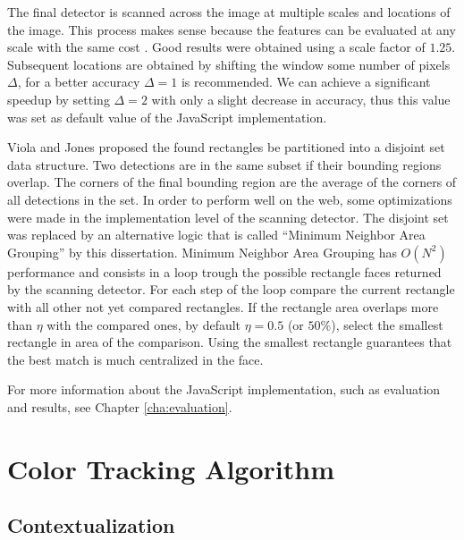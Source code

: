 The final detector is scanned across the image at multiple scales and locations of the image. This process makes sense because the features can be evaluated at any scale with the same cost \cite{Viola2001}. Good results were obtained using a scale factor of $1.25$. Subsequent locations are obtained by shifting the window some number of pixels $\Delta$, for a better accuracy $\Delta=1$ is recommended. We can achieve a significant speedup by setting $\Delta=2$ with only a slight decrease in accuracy, thus this value was set as default value of the JavaScript implementation.

Viola and Jones \cite{Viola2001} proposed the found rectangles be partitioned into a disjoint set data structure. Two detections are in the same subset if their bounding regions overlap. The corners of the final bounding region are the average of the corners of all detections in the set. In order to perform well on the web, some optimizations were made in the implementation level of the scanning detector. The disjoint set was replaced by an alternative logic that is called ``Minimum Neighbor Area Grouping'' by this dissertation. Minimum Neighbor Area Grouping has $O(N^2)$ performance \cite{black2007big} and consists in a loop trough the possible rectangle faces returned by the scanning detector. For each step of the loop compare the current rectangle with all other not yet compared rectangles. If the rectangle area overlaps more than $\eta$ with the compared ones, by default $\eta=0.5$ (or $50\%$), select the smallest rectangle in area of the comparison. Using the smallest rectangle guarantees that the best match is much centralized in the face.

For more information about the JavaScript implementation, such as evaluation and results, see Chapter \ref{cha:evaluation}.



\section{Color Tracking Algorithm} %
\label{sec:tracking_library_for_the_web:color_tracking_algorithm}

\subsection{Contextualization} %
\label{sub:tracking_library_for_the_web:color_tracking_algorithm:contextualization}

